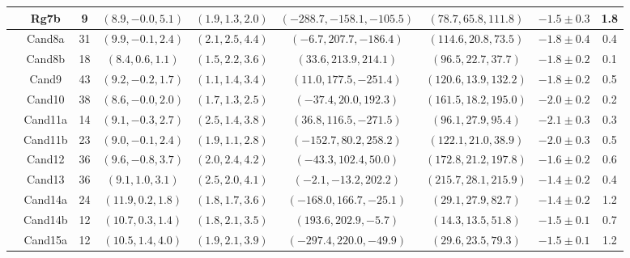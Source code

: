 \begin{table}[t!]
\begin{tabularx}{0.98\textwidth}{cc|ccccccc}
& Rg7b     & 9         & $(8.9,-0.0,5.1)$  & $(1.9,1.3,2.0)$                      & $(-288.7,-158.1,-105.5)$ & $(78.7,65.8,111.8)$               & $-1.5\pm 0.3$ & 1.8 \\
\hline\hline \parbox[t]{5mm}{} & Cand8a   & 31        & $(9.9,-0.1,2.4)$  & $(2.1,2.5,4.4)$                      & $(-6.7,207.7,-186.4)$    & $(114.6,20.8,73.5)$               & $-1.8\pm 0.4$ & 0.4 \\
& Cand8b   & 18        & $(8.4,0.6,1.1)$   & $(1.5,2.2,3.6)$                      & $(33.6,213.9,214.1)$     & $(96.5,22.7,37.7)$                & $-1.8\pm 0.2$ & 0.1 \\
& Cand9    & 43        & $(9.2,-0.2,1.7)$  & $(1.1,1.4,3.4)$                      & $(11.0,177.5,-251.4)$    & $(120.6,13.9,132.2)$              & $-1.8\pm 0.2$ & 0.5 \\
& Cand10   & 38        & $(8.6,-0.0,2.0)$  & $(1.7,1.3,2.5)$                      & $(-37.4,20.0,192.3)$     & $(161.5,18.2,195.0)$              & $-2.0\pm 0.2$ & 0.2 \\
& Cand11a  & 14        & $(9.1,-0.3,2.7)$  & $(2.5,1.4,3.8)$                      & $(36.8,116.5,-271.5)$    & $(96.1,27.9,95.4)$                & $-2.1\pm 0.3$ & 0.3 \\
& Cand11b  & 23        & $(9.0,-0.1,2.4)$  & $(1.9,1.1,2.8)$                      & $(-152.7,80.2,258.2)$    & $(122.1,21.0,38.9)$               & $-2.0\pm 0.3$ & 0.5 \\
& Cand12   & 36        & $(9.6,-0.8,3.7)$  & $(2.0,2.4,4.2)$                      & $(-43.3,102.4,50.0)$     & $(172.8,21.2,197.8)$              & $-1.6\pm 0.2$ & 0.6 \\
& Cand13   & 36        & $(9.1,1.0,3.1)$   & $(2.5,2.0,4.1)$                      & $(-2.1,-13.2,202.2)$     & $(215.7,28.1,215.9)$              & $-1.4\pm 0.2$ & 0.4 \\
& Cand14a  & 24        & $(11.9,0.2,1.8)$  & $(1.8,1.7,3.6)$                      & $(-168.0,166.7,-25.1)$   & $(29.1,27.9,82.7)$                & $-1.4\pm 0.2$ & 1.2 \\
& Cand14b  & 12        & $(10.7,0.3,1.4)$  & $(1.8,2.1,3.5)$                      & $(193.6,202.9,-5.7)$     & $(14.3,13.5,51.8)$                & $-1.5\pm 0.1$ & 0.7 \\
& Cand15a  & 12        & $(10.5,1.4,4.0)$  & $(1.9,2.1,3.9)$                      & $(-297.4,220.0,-49.9)$   & $(29.6,23.5,79.3)$                & $-1.5\pm 0.1$ & 1.2 \\

\end{tabularx}
\end{table}
